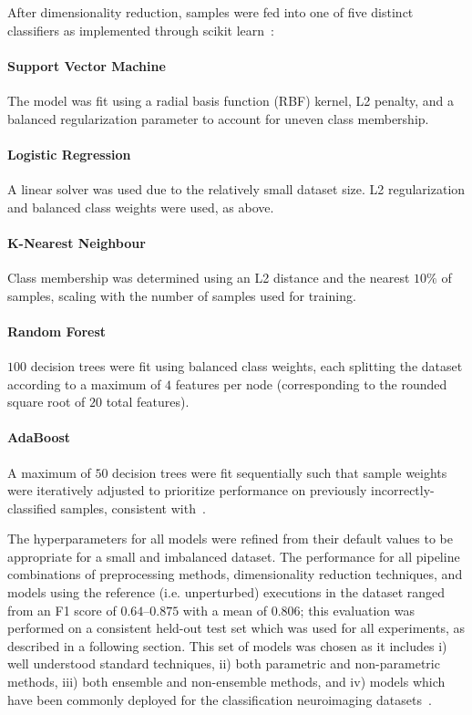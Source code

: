 \documentclass[10pt]{SelfArx} %
\begin{document}
After dimensionality reduction, samples were fed into one of five distinct classifiers as implemented through scikit
learn~\cite{Pedregosa2011-uz}:

\paragraph{Support Vector Machine} The model was fit using a radial basis function (RBF) kernel, L2 penalty, and a
balanced regularization parameter to account for uneven class membership.

\paragraph{Logistic Regression} A linear solver was used due to the relatively small dataset size. L2 regularization
and balanced class weights were used, as above.

\paragraph{K-Nearest Neighbour} Class membership was determined using an L2 distance and the nearest $10\%$ of
samples, scaling with the number of samples used for training.

\paragraph{Random Forest} $100$ decision trees were fit using balanced class weights, each splitting the dataset
according to a maximum of $4$ features per node (corresponding to the rounded square root of $20$ total features).

\paragraph{AdaBoost} A maximum of $50$ decision trees were fit sequentially such that sample weights were iteratively
adjusted to prioritize performance on previously incorrectly-classified samples, consistent with~\cite{Freund1997-qy}.

The hyperparameters for all models were refined from their default values to be appropriate for a small and imbalanced
dataset. The performance for all pipeline combinations of preprocessing methods, dimensionality reduction techniques,
and models using the reference (i.e. unperturbed) executions in the dataset ranged from an F1 score of $0.64 – 0.875$
with a mean of $0.806$; this evaluation was performed on a consistent held-out test set which was used for all
experiments, as described in a following section. This set of models was chosen as it includes i) well understood
standard techniques, ii) both parametric and non-parametric methods, iii) both ensemble and non-ensemble
methods, and iv) models which have been commonly deployed for the classification neuroimaging
datasets~\cite{Meier2012-ve,Tunc2016-cz, Zhu2018-cs,Payabvash2019-tm,Crossley2014-tg,Park2015-uj,Nayak2016-wl,Tolan2018-nq}.
\end{document}
